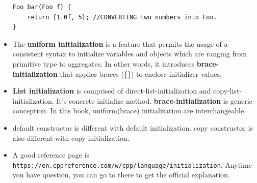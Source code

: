 \documentclass[a4paper,11pt,twoside]{book}
\begin{document}
\begin{itemize}
\begin{lstlisting}[numbers=none]	
Foo bar(Foo f) {
	return {1.0f, 5}; //CONVERTING two numbers into Foo.
}
\end{lstlisting}

	\item The \textbf{uniform initialization} is a feature that permits the usage of a consistent syntax to initialize variables and objects which are ranging from primitive type to aggregates. In other words, it introduces \textbf{brace-initialization} that applies braces (\{\}) to enclose initializer values.
	
	\item \textbf{List initialization} is comprised of direct-list-initialization and copy-list-initialization. It's concrete initialize method. \textbf{brace-initialization} is generic conception. In this book, uniform(brace) initialization are interchangeable. 
	
	\item default constructor is different with default initialization. copy constructor is also different with copy initialization.
	
	\item A good reference page is \verb|https://en.cppreference.com/w/cpp/language/initialization|. Anytime you have question, you can go to there to get the official explanation. 
\end{itemize}
\end{document}
